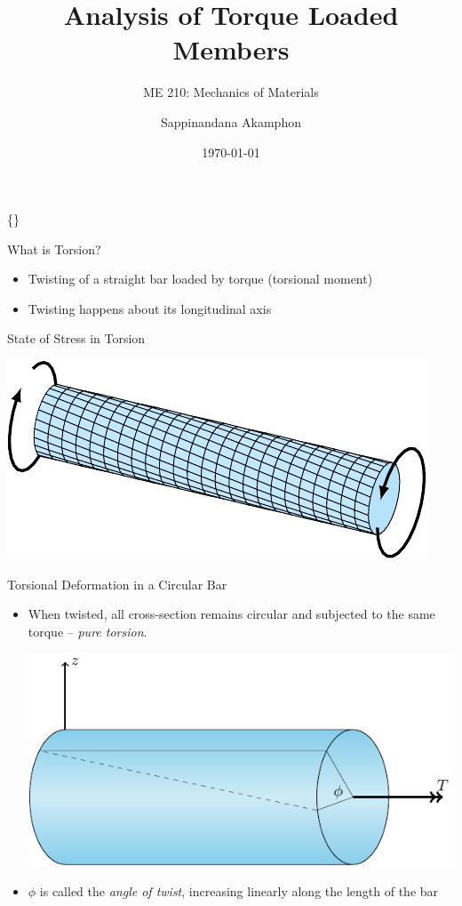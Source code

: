 \documentclass[10pt, svgnames]{beamer}
\author{Sappinandana Akamphon}
\date{\today}
\title{Analysis of Torque Loaded Members}
\subtitle{ME 210: Mechanics of Materials}
\institute{Department of Mechanical Engineering, TSE}
\date{}
\begin{document}
\begin{frame}[label={sec:org6a5a613}]{\{\}}
\maketitle
\end{frame}

\begin{frame}[label={sec:orgf160d7e}]{What is Torsion?}
\begin{itemize}
\item Twisting of a straight bar loaded by torque (torsional moment)

\item Twisting happens about its longitudinal axis
\end{itemize}
\end{frame}

\begin{frame}[label={sec:org6890e5a}]{State of Stress in Torsion}
\begin{center}
\includegraphics[width=.9\linewidth]{pictures/state-of-torsion-stress.pdf}
\end{center}
\end{frame}

\begin{frame}[label={sec:orgcd23f1f}]{Torsional Deformation in a Circular Bar}
\begin{itemize}
\item When twisted, all cross-section remains circular and subjected to the same torque -- \emph{pure torsion}.

\begin{center}
\includegraphics[width=.9\linewidth]{pictures/twisted-bar.pdf}
\end{center}

\item \(\phi\) is called the \emph{angle of twist}, increasing linearly along the length of the bar
\end{itemize}
\end{frame}
\end{document}
